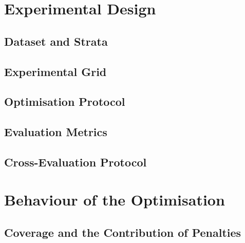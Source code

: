 \label{chap:results}

\section{Experimental Design}
\label{sec:experimentaldesign}

\subsection{Dataset and Strata}

\subsection{Experimental Grid}

\subsection{Optimisation Protocol}

\subsection{Evaluation Metrics}

\subsection{Cross-Evaluation Protocol}

\section{Behaviour of the Optimisation}
\label{sec:optimisationbehaviour}

\subsection{Coverage and the Contribution of Penalties}

